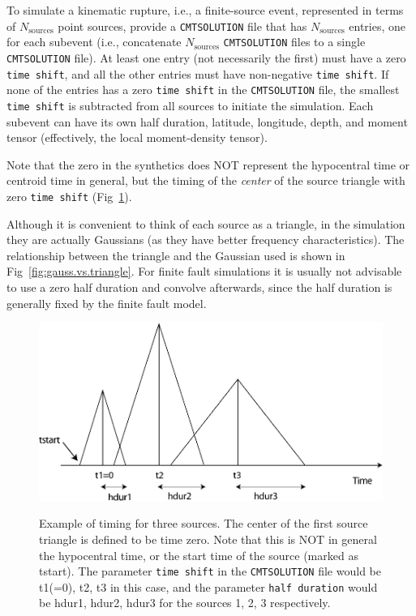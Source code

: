 \documentclass[oneside,english]{book}
\begin{document}
\label{To-simulate-a}To simulate a kinematic rupture, i.e., a finite-source
event, represented in terms of $N_{\mathrm{sources}}$ point sources,
provide a \texttt{CMTSOLUTION} file that has $N_{\mathrm{sources}}$
entries, one for each subevent (i.e., concatenate $N_{\mathrm{sources}}$
\texttt{CMTSOLUTION} files to a single \texttt{CMTSOLUTION} file).
At least one entry (not necessarily the first) must have a zero \texttt{time
shift}, and all the other entries must have non-negative \texttt{time
shift}. If none of the entries has a zero \texttt{time shift} in the \texttt{CMTSOLUTION} file, the smallest \texttt{time shift} is subtracted from all sources to initiate the simulation. Each subevent can have its own half duration, latitude, longitude,
depth, and moment tensor (effectively, the local moment-density tensor).

Note that the zero in the synthetics does NOT represent the hypocentral
time or centroid time in general, but the timing of the \textit{center}
of the source triangle with zero \texttt{time shift} (Fig~\ref{fig:source_timing}).

Although it is convenient to think of each source as a triangle, in
the simulation they are actually Gaussians (as they have better frequency
characteristics). The relationship between the triangle and the Gaussian
used is shown in Fig~\ref{fig:gauss.vs.triangle}. For finite fault
simulations it is usually not advisable to use a zero half duration
and convolve afterwards, since the half duration is generally fixed
by the finite fault model.

{\small }%
\begin{figure}[H]
\noindent \begin{centering}
{\small \includegraphics[width=5in]{figures/source_timing} }
\par\end{centering}{\small \par}

\caption{Example of timing for three sources. The center of the first source
triangle is defined to be time zero. Note that this is NOT in general
the hypocentral time, or the start time of the source (marked as tstart).
The parameter \texttt{time shift} in the \texttt{CMTSOLUTION} file
would be t1(=0), t2, t3 in this case, and the parameter \texttt{half
duration} would be hdur1, hdur2, hdur3 for the sources 1, 2, 3 respectively.}


{\small \label{fig:source_timing} }
\end{figure}
{\small \par}
\end{document}
